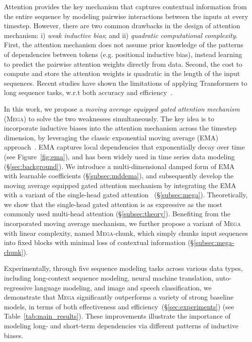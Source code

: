 Attention provides the key mechanism that captures contextual information from the entire sequence by modeling pairwise interactions between the inputs at every timestep. However, there are two common drawbacks in the design of attention mechanism: i) \emph{weak inductive bias}; and ii) \emph{quadratic computational complexity}. First, the attention mechanism does not assume prior knowledge of the patterns of dependencies between tokens (e.g. positional inductive bias), instead learning to predict the pairwise attention weights directly from data. Second, the cost to compute and store the attention weights is quadratic in the length of the input sequences. Recent studies have shown the limitations of applying Transformers to long sequence tasks,  w.r.t both accuracy and efficiency~\citep{tay2020efficient}.

In this work, we propose a \emph{moving average equipped gated attention mechanism} (\textsc{Mega}) to solve the two weaknesses simultaneously. The key idea is to incorporate inductive biases into the attention mechanism across the timestep dimension, by leveraging the classic  exponential moving average (EMA) approach~\citep{hunter1986exponentially}. EMA captures local dependencies that exponentially decay over time (see Figure~\ref{fig:ema}), and has been widely used in time series data modeling (\S\ref{sec:background}).
We introduce a multi-dimensional damped form of EMA with learnable coefficients (\S\ref{subsec:mddema}), and subsequently develop the moving average equipped gated attention mechanism by integrating the EMA with a variant of the single-head gated attention~\citep{hua2022transformer} (\S\ref{subsec:mega}).
Theoretically, we show that the single-head gated attention is as expressive as the most commonly used multi-head attention (\S\ref{subsec:theory}). 
Benefiting from the incorporated moving average mechanism, we further propose a variant of \textsc{Mega} with linear complexity, named \textsc{Mega}-chunk,  which simply chunks input sequences into fixed blocks with minimal loss of contextual information (\S\ref{subsec:mega-chunk}).

Experimentally, through five sequence modeling tasks across various data types, including long-context sequence modeling, neural machine translation, auto-regressive language modeling, and image and speech classification, we demonstrate that \textsc{Mega} significantly outperforms a variety of strong baseline models, in terms of both effectiveness and efficiency~(\S\ref{sec:experiments}) (see Table~\ref{tab:main_results}). 
These improvements illustrate the importance of modeling long- and short-term dependencies via different patterns of inductive biases.


